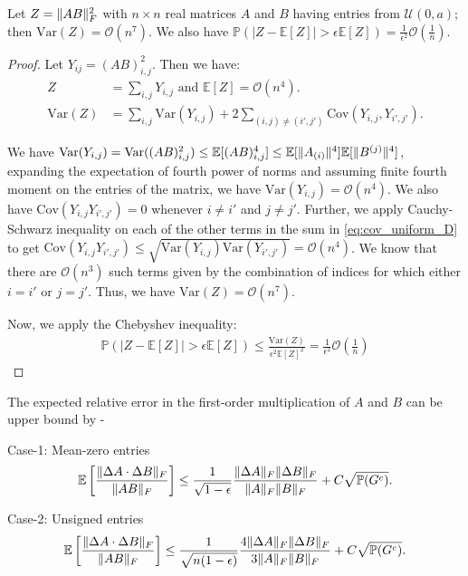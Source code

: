 \documentclass[onefignum,onetabnum]{siamart171218}
\DeclarePairedDelimiter\norm{\lVert}{\rVert}
\begin{document}
\begin{lemma}
    Let $Z = \norm{AB}_F^2$ with $n \times n$ real matrices $A$ and $B$ having entries from $\mathcal{U}(0,a)$; then $\text{Var}(Z) = \mathcal{O}(n^7)$. We also have  $ \mathbb{P}(|Z -  \mathbb{E}[Z]| > \epsilon \mathbb{E}[Z]) = \frac{1}{\epsilon^2} \mathcal{O}\left(\frac{1}{n}\right).$\label{th:tailbound_uniform_case}  
\end{lemma}
\begin{proof}
    Let $Y_{ij} = (AB)^2_{i,j}$. Then we have:
    \begin{align}
        Z &= \sum_{i,j} Y_{i,j} \text{ and } \mathbb{E}[Z] = \mathcal{O}(n^4).\\
        \text{Var}(Z) &= \sum_{i,j} \text{Var}(Y_{i,j}) + 2\sum_{(i,j) \neq (i',j')} \text{Cov}(Y_{i,j},Y_{i',j'}). \label{eq:cov_uniform_D} 
    \end{align}

We have $\text{Var}(Y_{i,j}) = \text{Var}((AB)_{i,j}^2) \leq \mathbb{E}[(AB)^4_{i,j}] \leq \mathbb{E}[\norm{A_{(i)}}^4] \mathbb{E}[\norm{B^{(j)}}^4]$, expanding the expectation of fourth power of norms and assuming finite fourth moment on the entries of the matrix, we have $\text{Var}(Y_{i,j}) = \mathcal{O}(n^4)$.  
We also have $\text{Cov}(Y_{i,j}Y_{i',j'}) = 0$ whenever $i \neq i'$ and $j \neq j'$. 
Further, we apply Cauchy-Schwarz inequality on each of the other terms in the sum in \eqref{eq:cov_uniform_D} to get
$\text{Cov}(Y_{i,j}Y_{i',j'}) \leq \sqrt{\text{Var}(Y_{i,j} )\text{Var}(Y_{i',j'})} = \mathcal{O}(n^4)$.
We know that there are $\mathcal{O}(n^3)$ such terms given by the combination of indices for which either $i = i'$ or $j = j'$. Thus, we have $\text{Var}(Z) = \mathcal{O}(n^7)$. 

Now, we apply the Chebyshev inequality:
\begin{align*}
    \mathbb{P}(|Z -  \mathbb{E}[Z]| > \epsilon \mathbb{E}[Z]) \leq \frac{\text{Var}(Z)}{\epsilon^2 \mathbb{E}[Z]^2} = \frac{1}{\epsilon^2}\mathcal{O}\left(\frac{1}{n} \right)
\end{align*}
\end{proof}

\begin{theorem}
The expected relative error in the first-order multiplication of $A$ and $B$ can be upper bound by -

Case-1: Mean-zero entries
\begin{equation*}
    \mathbb{E}\left[\frac{\norm{\Delta A \cdot \Delta B}_F}{\norm{AB}_F}\right] \leq \frac{1}{\sqrt{1-\epsilon}} \frac{\norm{\Delta A}_F \norm{\Delta B}_F}{ \norm{A}_F \norm{B}_F } + C \sqrt{\mathbb{P}(G^c)}.
\end{equation*}

Case-2: Unsigned entries
\begin{equation*}
    \mathbb{E}\left[\frac{\norm{\Delta A \cdot \Delta B}_F}{\norm{AB}_F}\right] \leq \frac{1}{\sqrt{n(1-\epsilon)}} \frac{4\norm{\Delta A}_F \norm{\Delta B}_F}{3 \norm{A}_F \norm{B}_F } + C \sqrt{\mathbb{P}(G^c)}.
\end{equation*}   
\end{theorem}
\end{document}
